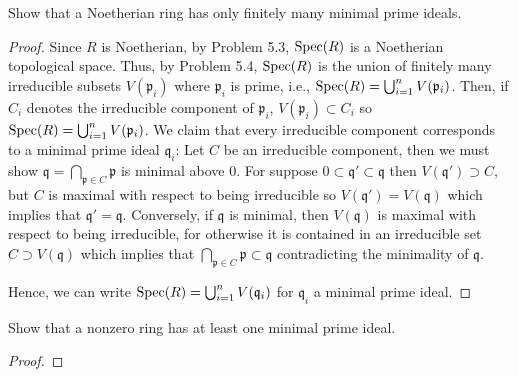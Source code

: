 \newpage
\begin{problem}
Show that a Noetherian ring has only finitely many minimal prime
ideals.
\end{problem}
\begin{proof}
Since $R$ is Noetherian, by Problem 5.3, $\operatorname{Spec}(R)$ is a Noetherian
topological space. Thus, by Problem 5.4, $\operatorname{Spec}(R)$ is the union of
finitely many irreducible subsets $V(\mathfrak{p}_i)$ where
$\mathfrak{p}_i$ is prime, i.e., $\operatorname{Spec}(R)=\bigcup_{i=1}^n
V(\mathfrak{p}_i)$. Then, if $C_i$ denotes the irreducible component
of $\mathfrak{p}_i$, $V(\mathfrak{p}_i)\subset C_i$ so
$\operatorname{Spec}(R)=\bigcup_{i=1}^n V(\mathfrak{p}_i)$. We claim that every
irreducible component corresponds to a minimal prime ideal
$\mathfrak{q}_i$: Let $C$ be an irreducible component, then we must
show $\mathfrak{q}=\bigcap_{\mathfrak{p}\in C}\mathfrak{p}$ is minimal
above $0$. For suppose $0\subset\mathfrak{q'}\subset\mathfrak{q}$ then
$V(\mathfrak{q}')\supset C$, but $C$ is maximal with respect to being
irreducible so $V(\mathfrak{q}')=V(\mathfrak{q})$ which implies that
$\mathfrak{q}'=\mathfrak{q}$. Conversely, if $\mathfrak{q}$ is
minimal, then $V(\mathfrak{q})$ is maximal with respect to being
irreducible, for otherwise it is contained in an irreducible set
$C\supset V(\mathfrak{q})$ which implies that
$\bigcap_{\mathfrak{p}\in C}\mathfrak{p}\subset\mathfrak{q}$
contradicting the minimality of $\mathfrak{q}$.

Hence, we can write $\operatorname{Spec}(R)=\bigcup_{i=1}^nV(\mathfrak{q}_i)$ for
$\mathfrak{q}_i$ a minimal prime ideal.
\end{proof}
\newpage
\begin{problem}
Show that a nonzero ring has at least one minimal prime ideal.
\end{problem}
\begin{proof}
\end{proof}

